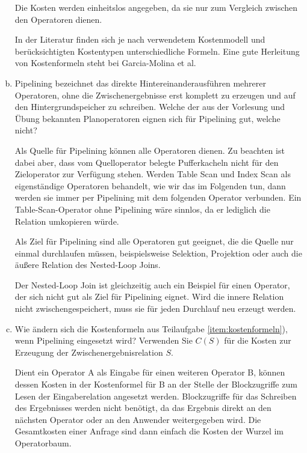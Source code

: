\begin{enumerate}[a)]
\begin{solution}
		Die Kosten werden einheitslos angegeben, da sie nur zum Vergleich zwischen den Operatoren dienen.

		In der Literatur finden sich je nach verwendetem Kostenmodell und berücksichtigten Kostentypen unterschiedliche Formeln. Eine gute Herleitung von Kostenformeln steht bei Garcia-Molina et al.
	\end{solution}

\item \label{item:pipelining} Pipelining bezeichnet das direkte Hintereinanderausführen mehrerer Operatoren, ohne die Zwischenergebnisse erst komplett zu erzeugen und auf den Hintergrundspeicher zu schreiben.
	Welche der aus der Vorlesung und Übung bekannten Planoperatoren eignen sich für Pipelining gut, welche nicht?

	\begin{solution}
		Als Quelle für Pipelining können alle Operatoren dienen.
		Zu beachten ist dabei aber, dass vom Quelloperator belegte Pufferkacheln nicht für den Zieloperator zur Verfügung stehen.
		Werden Table Scan und Index Scan als eigenständige Operatoren behandelt, wie wir das im Folgenden tun, dann werden sie immer per Pipelining mit dem folgenden Operator verbunden.
		Ein Table-Scan-Operator ohne Pipelining wäre sinnlos, da er lediglich die Relation umkopieren würde.

		Als Ziel für Pipelining sind alle Operatoren gut geeignet, die die Quelle nur einmal durchlaufen müssen, beispielsweise Selektion, Projektion oder auch die äußere Relation des Nested-Loop Joins.

		Der Nested-Loop Join ist gleichzeitig auch ein Beispiel für einen Operator, der sich nicht gut als Ziel für Pipelining eignet.
		Wird die innere Relation nicht zwischengespeichert, muss sie für jeden Durchlauf neu erzeugt werden.
	\end{solution}

\item Wie ändern sich die Kostenformeln aus Teilaufgabe \ref{item:kostenformeln}), wenn Pipelining eingesetzt wird?
Verwenden Sie \(C(S)\) für die Kosten zur Erzeugung der Zwischenergebnisrelation \(S\).

	\begin{solution}
		Dient ein Operator A als Eingabe für einen weiteren Operator B, können dessen Kosten in der Kostenformel für B an der Stelle der Blockzugriffe zum Lesen der Eingaberelation angesetzt werden.
		Blockzugriffe für das Schreiben des Ergebnisses werden nicht benötigt, da das Ergebnis direkt an den nächsten Operator oder an den Anwender weitergegeben wird.
		Die Gesamtkosten einer Anfrage sind dann einfach die Kosten der Wurzel im Operatorbaum.


\end{solution}
\end{enumerate}
